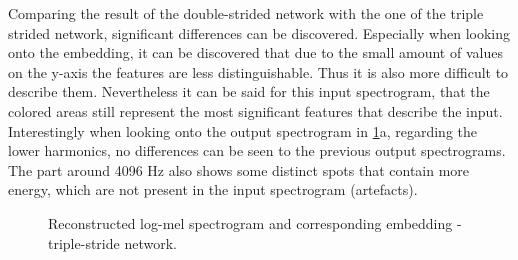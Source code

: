 Comparing the result of the double-strided network with the one of the triple strided network, significant differences can be discovered. Especially when looking onto the embedding, it can be discovered that due to the small amount of values on the y-axis the features are less distinguishable. Thus it is also more difficult to describe them. Nevertheless it can be said for this input spectrogram, that the colored areas still represent the most significant features that describe the input. Interestingly when looking onto the output spectrogram in \ref{fig:res_mel_triple_str_2D_output_emb}a, regarding the lower harmonics, no differences can be seen to the previous output spectrograms. The part around 4096 Hz also shows some distinct spots that contain more energy, which are not present in the input spectrogram (artefacts).

\begin{figure}[htb!]
    \centering
    \captionsetup{justification=centering}
    \caption{Reconstructed log-mel spectrogram and corresponding embedding - triple-stride network.}
    \label{fig:res_mel_triple_str_2D_output_emb}
\end{figure}

